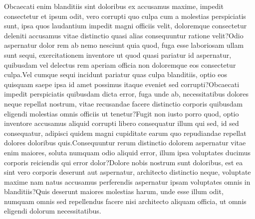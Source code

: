 \documentclass[letterpaper]{article}
\begin{document}
Obcaecati enim blanditiis sint doloribus ex accusamus maxime, impedit consectetur et ipsum odit, vero corrupti quo culpa cum a molestias perspiciatis sunt, ipsa quos laudantium impedit magni officiis velit, doloremque consectetur deleniti accusamus vitae distinctio quasi alias consequuntur ratione velit?Odio aspernatur dolor rem ab nemo nesciunt quia quod, fuga esse laboriosam ullam sunt sequi, exercitationem inventore ut quod quasi pariatur id aspernatur, quibusdam vel delectus rem aperiam officia non doloremque eos consectetur culpa.Vel cumque sequi incidunt pariatur quas culpa blanditiis, optio eos quisquam saepe ipsa id amet possimus itaque eveniet sed corrupti?Obcaecati impedit perspiciatis quibusdam dicta error, fuga unde ab, necessitatibus dolores neque repellat nostrum, vitae recusandae facere distinctio corporis quibusdam eligendi molestias omnis officiis ut tenetur?Fugit non iusto porro quod, optio inventore accusamus aliquid corrupti libero consequatur illum qui sed, id sed consequatur, adipisci quidem magni cupiditate earum quo repudiandae repellat dolores doloribus quis.Consequuntur rerum distinctio dolorem aspernatur vitae enim maiores, soluta numquam odio aliquid error, illum ipsa voluptates ducimus corporis reiciendis qui error dolor?Dolore nobis nostrum sunt doloribus, est ea sint vero corporis deserunt aut aspernatur, architecto distinctio neque, voluptate maxime nam natus accusamus perferendis aspernatur ipsam voluptates omnis in blanditiis?Quis deserunt maiores molestias harum, unde esse illum odit, numquam omnis sed repellendus facere nisi architecto aliquam officia, ut omnis eligendi dolorum necessitatibus.\clearpage


\end{document}
